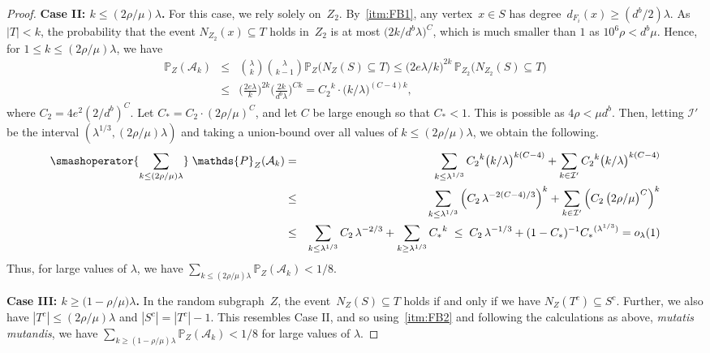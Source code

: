 \documentclass[final]{article}
\theoremstyle{definition}
\begin{document}
\begin{proof}
    \noindent \textbf{Case II: $k \leq (2\rho/\mu) \lambda$.} For this case, we rely solely on~$Z_2$. By~\ref{itm:FB1}, any vertex~$x \in S$ has degree~$d_{F_i}(x) \geq (d^b/2)\lambda$. As $|T| < k$, the probability that the event $N_{Z_2}(x) \subseteq T$ holds in~$Z_2$ is at most $\bigl(2k/d^b\lambda\bigr)^C$, which is much smaller than $1$ as $10^6\rho < d^b \mu$. Hence, for $1 \leq k \leq (2\rho/\mu)\lambda$, we have 
    \begin{eqnarray*}
        \mathds{P}_{Z}(\mathcal{A}_k) &\leq& \binom{\lambda}{k}\binom{\lambda}{k-1} \mathds{P}_Z\bigl(N_Z(S) \subseteq T\bigr) \leq \bigl(2e\lambda/{k}\bigr)^{\!2k} \,\mathds{P}_{Z_2}\bigl(N_{Z_2}(S) \subseteq T\bigr) \\
        &\leq& \biggl(\frac{2e\lambda}{k}\biggr)^{\!2k} \biggl(\frac{2k}{d^b\lambda}\biggr)^{\!Ck} = {C_2}^k\cdot \bigl(k/\lambda\bigr)^{\!(C-4)k},
    \end{eqnarray*}
    where $C_2 = 4e^2 (2/d^b)^C$. Let $C_* = C_2\cdot (2\rho/\mu)^C$, and let $C$ be large enough so that $C_* < 1$. This is possible as $4\rho < \mu d^b$. Then, letting $\mathcal{I}'$ be the interval $(\lambda^{1/3}, (2\rho/\mu)\lambda)$ and taking a union-bound over all values of $k \leq (2\rho/\mu)\lambda$, we obtain the following. 
    \begin{eqnarray*}
        \smashoperator{\sum_{k \leq (2\rho/\mu)\lambda}}\; \mathds{P}_Z(\mathcal{A}_k) &=& \sum_{k \leq \lambda^{1/3}} {C_2}^k \bigl(k/\lambda\bigr)^{k(C-4)} + \sum_{k \in \mathcal{I}'} {C_2}^k \bigl( k/\lambda\bigr)^{k(C-4)}\\
        &\leq& \sum_{k \leq \lambda^{1/3}} {\Bigl(C_2\, \lambda^{-2(C-4)/3} \Bigr)}^k + \sum_{k \in \mathcal{I}'} {\Bigl(C_2\, \bigl(2\rho/\mu\bigr)^C \Bigr)}^k \\
        &\leq& \sum_{k \leq \lambda^{1/3}} C_2\, \lambda^{-2/3} + \sum_{k \geq \lambda^{1/3}} {C_*}^k\; \leq\;  C_2\, \lambda^{-1/3} + (1- C_*)^{-1}{C_*}^{(\lambda^{1/3})} =  o_\lambda(1)
    \end{eqnarray*}
    Thus, for large values of $\lambda$, we have $\sum_{k \leq (2\rho/\mu)\lambda} \mathds{P}_Z(\mathcal{A}_k) < 1/8$. 

    \textbf{Case III: $k \geq  \big(1 - \rho/\mu\big)\lambda$.} In the random subgraph~$Z$, the event~$N_Z(S) \subseteq T$ holds if and only if we have $N_Z(T^c) \subseteq S^c$. Further, we also have $|T^c| \leq (2\rho/\mu)\lambda$ and $|S^c| = |T^c| - 1$. This resembles Case II, and so using~\ref{itm:FB2} and following the calculations as above, \emph{mutatis mutandis}, we have $\sum_{k \geq (1 - \rho/\mu)\lambda} \mathds{P}_Z(\mathcal{A}_k) < 1/8$ for large values of $\lambda$. 


\end{proof}
\end{document}
